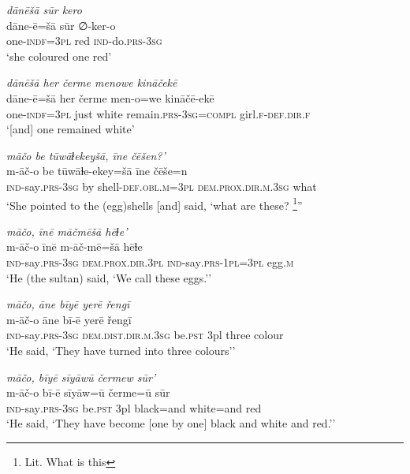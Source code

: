 \ea \label{ŽH.84}
\textit{dānēšā sūr kero} \\ 
\gll dāne-ē=šā sūr ∅-ker-o \\ 
 one\textsc{-indf}\textsc{=3pl} red \textsc{ind-}do\textsc{.prs}\textsc{-3sg} \\ 
\glt `she coloured one red'
\z 
 
\ea \label{ŽH.85}
\textit{dānēšā her čerme menowe kināčekē} \\ 
\gll dāne-ē=šā her čerme men-o=we kināčē-ekē \\ 
 one\textsc{-indf}\textsc{=3pl} just white remain\textsc{.prs}\textsc{-3sg}\textsc{=compl} girl\textsc{\textsc{.f}}\textsc{-def}\textsc{.dir}\textsc{\textsc{.f}} \\ 
\glt `[and] one remained white'
\z 
 
\ea \label{ŽH.86}
\textit{māčo be tūwāɫekeyšā, īne čēšen?’} \\ 
\gll m-āč-o be tūwāɫe-ekey=šā īne čēše=n \\ 
 \textsc{ind-}say\textsc{.prs}\textsc{-3sg} by shell\textsc{-def}\textsc{.obl}\textsc{.m}\textsc{=3pl} \textsc{dem.prox}\textsc{.dir}\textsc{.m}\textsc{.3sg} what \\ 
\glt `She pointed to the (egg)shells [and] said, ‘what are these? \footnote{Lit. What is this}''
\z 
 
\ea \label{ŽH.87}
\textit{māčo, īnē māčmēšā hēɫe’} \\ 
\gll m-āč-o īnē m-āč-mē=šā hēɫe \\ 
 \textsc{ind-}say\textsc{.prs}\textsc{-3sg} \textsc{dem.prox}\textsc{.dir}\textsc{.3pl} \textsc{ind-}say\textsc{.prs}\textsc{-1pl}\textsc{=3pl} egg\textsc{.m} \\ 
\glt `He (the sultan) said, ‘We call these eggs.’'
\z 
 
\ea \label{ŽH.89}
\textit{māčo, āne bīyē yerē řengī} \\ 
\gll m-āč-o āne bī-ē yerē řengī \\ 
 \textsc{ind-}say\textsc{.prs}\textsc{-3sg} \textsc{dem.dist}\textsc{.dir}\textsc{.m}\textsc{.3sg} be\textsc{.pst} 3pl three colour \\ 
\glt `He said, ‘They have turned into three colours’'
\z 
 
\ea \label{ŽH.91}
\textit{māčo, bīyē sīyāwū čermew sūr’} \\ 
\gll m-āč-o bī-ē sīyāw=ū čerme=ū sūr \\ 
 \textsc{ind-}say\textsc{.prs}\textsc{-3sg} be\textsc{.pst} 3pl black=and white=and red \\ 
\glt `He said, ‘They have become [one by one] black and white and red.’'
\z 
 
